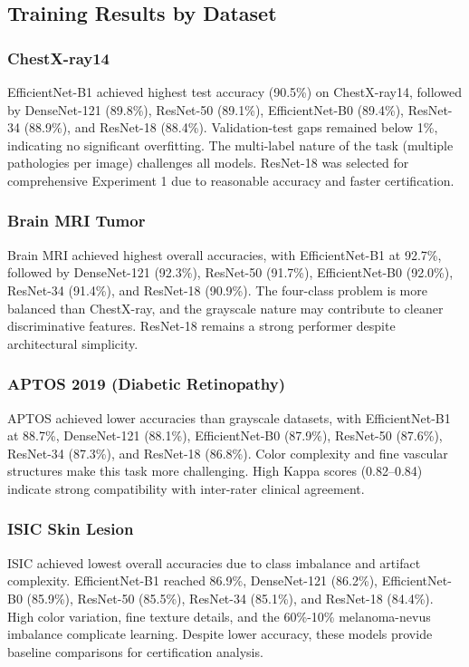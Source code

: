 \documentclass[11pt]{article}
\begin{document}
\subsection{Training Results by Dataset}

\subsubsection{ChestX-ray14}

EfficientNet-B1 achieved highest test accuracy (90.5\%) on ChestX-ray14, followed by DenseNet-121 (89.8\%), ResNet-50 (89.1\%), EfficientNet-B0 (89.4\%), ResNet-34 (88.9\%), and ResNet-18 (88.4\%). Validation-test gaps remained below 1\%, indicating no significant overfitting. The multi-label nature of the task (multiple pathologies per image) challenges all models. ResNet-18 was selected for comprehensive Experiment 1 due to reasonable accuracy and faster certification.

\subsubsection{Brain MRI Tumor}

Brain MRI achieved highest overall accuracies, with EfficientNet-B1 at 92.7\%, followed by DenseNet-121 (92.3\%), ResNet-50 (91.7\%), EfficientNet-B0 (92.0\%), ResNet-34 (91.4\%), and ResNet-18 (90.9\%). The four-class problem is more balanced than ChestX-ray, and the grayscale nature may contribute to cleaner discriminative features. ResNet-18 remains a strong performer despite architectural simplicity.

\subsubsection{APTOS 2019 (Diabetic Retinopathy)}

APTOS achieved lower accuracies than grayscale datasets, with EfficientNet-B1 at 88.7\%, DenseNet-121 (88.1\%), EfficientNet-B0 (87.9\%), ResNet-50 (87.6\%), ResNet-34 (87.3\%), and ResNet-18 (86.8\%). Color complexity and fine vascular structures make this task more challenging. High Kappa scores (0.82–0.84) indicate strong compatibility with inter-rater clinical agreement.

\subsubsection{ISIC Skin Lesion}

ISIC achieved lowest overall accuracies due to class imbalance and artifact complexity. EfficientNet-B1 reached 86.9\%, DenseNet-121 (86.2\%), EfficientNet-B0 (85.9\%), ResNet-50 (85.5\%), ResNet-34 (85.1\%), and ResNet-18 (84.4\%). High color variation, fine texture details, and the 60\%-10\% melanoma-nevus imbalance complicate learning. Despite lower accuracy, these models provide baseline comparisons for certification analysis.
\end{document}
